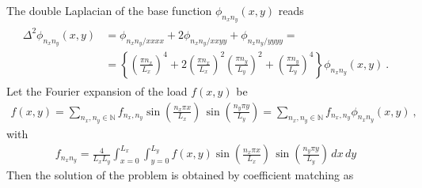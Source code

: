 \documentclass[letterpaper,10pt,english]{jupyterBook}
\begin{document}
\sphinxAtStartPar
{} The double Laplacian of the base function \(\phi_{n_x n_y}(x,y)\) reads
\begin{equation*}
\begin{split}\begin{aligned}
  \Delta^2 \phi_{n_x n_y}(x,y) 
  & = \phi_{n_x n_y/xxxx} + 2  \phi_{n_x n_y/xxyy} +  \phi_{n_x n_y/yyyy} = \\
  & = \left\{ \left( \frac{\pi n_x}{L_x} \right)^4 + 2 \left( \frac{\pi n_x}{L_x} \right)^2 \left( \frac{\pi n_y}{L_y} \right)^2 + \left( \frac{\pi n_y}{L_y} \right)^4 \right\} \phi_{n_x n_y}(x,y) \ .
\end{aligned}\end{split}
\end{equation*}
\sphinxAtStartPar
{} Let the Fourier expansion of the load \(f(x,y)\) be
\begin{equation*}
\begin{split}f(x,y) = \sum_{n_x,n_y \in \mathbb{N}} f_{n_x, n_y} \sin\left( \frac{n_x \pi x}{L_x} \right) \, \sin\left( \frac{n_y \pi y}{L_y} \right) = \sum_{n_x,n_y \in \mathbb{N}} f_{n_x, n_y} \phi_{n_x n_y}(x,y) \ ,\end{split}
\end{equation*}
\sphinxAtStartPar
with
\begin{equation}\label{equation:ch/solids/plates-shells/kirchhoff:eq:plates:kirchhoff:analytic:rectangular:load-fourier-coeff}
\begin{split}f_{n_x n_y} = \frac{4}{L_x L_y} \int_{x=0}^{L_x} \int_{y=0}^{L_y} f(x,y) \sin\left( \frac{n_x \pi x}{L_x} \right) \, \sin\left( \frac{n_y \pi y}{L_y} \right) \,dx \, dy \end{split}
\end{equation}
\sphinxAtStartPar
Then the solution of the problem is obtained by coefficient matching as
\end{document}
